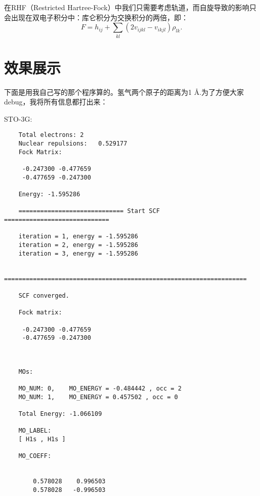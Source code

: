 \documentclass[12pt,a4paper,openany,twoside]{article}
\numberwithin{equation}{section}
\begin{document}
                在RHF（Restricted Hartree-Fock）中我们只需要考虑轨道，而自旋导致的影响只会出现在双电子积分中：库仑积分为交换积分的两倍，即：
                \begin{equation}
                    F = h_{ij} + \sum_{kl} (2 v_{ijkl} - v_{ikjl}) \rho_{lk}.
                \end{equation}




\section{效果展示}
下面是用我自己写的那个程序算的。氢气两个原子的距离为1 \AA.为了方便大家debug，我将所有信息都打出来：


STO-3G:
\begin{lstlisting}
    Total electrons: 2                                             
    Nuclear repulsions:   0.529177
    Fock Matrix:
    
     -0.247300 -0.477659
     -0.477659 -0.247300
    
    Energy: -1.595286
    
    ============================= Start SCF =============================
    
    iteration = 1, energy = -1.595286
    iteration = 2, energy = -1.595286
    iteration = 3, energy = -1.595286
    
    ===================================================================
    
    SCF converged.
    
    Fock matrix:
    
     -0.247300 -0.477659
     -0.477659 -0.247300
    
    
    
    MOs:
    
    MO_NUM: 0,    MO_ENERGY = -0.484442 , occ = 2
    MO_NUM: 1,    MO_ENERGY = 0.457502 , occ = 0
    
    Total Energy: -1.066109
    
    MO_LABEL:
    [ H1s , H1s ]
    
    MO_COEFF:
    
    
        0.578028    0.996503
        0.578028   -0.996503
\end{lstlisting}
\end{document}

